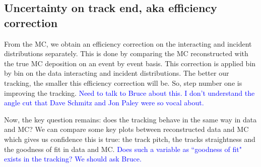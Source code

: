 \subsection{Uncertainty on track end, aka efficiency correction}
From the MC, we obtain an efficiency correction on the interacting and incident distributions separately. This is done by comparing the MC reconstructed with the true MC deposition on an event by event basis.
This correction is applied bin by bin on the data interacting and incident distributions.
The better our tracking, the smaller this efficiency correction will be. So, step number one is improving the tracking.
\textcolor{blue}{Need to talk to Bruce about this.}
\textcolor{blue}{ I don't understand the angle cut that Dave Schmitz and Jon Paley were so vocal about.}

Now, the key question remains: does the tracking behave in the same way in data and MC? 
We can compare some key plots between reconstructed data and MC which gives us confidence this is true: the track pitch, the tracks straightness and the goodness of fit in data and MC. \textcolor{blue}{ Does such a variable as ``goodness of fit" exists in the tracking? We should ask Bruce.}
